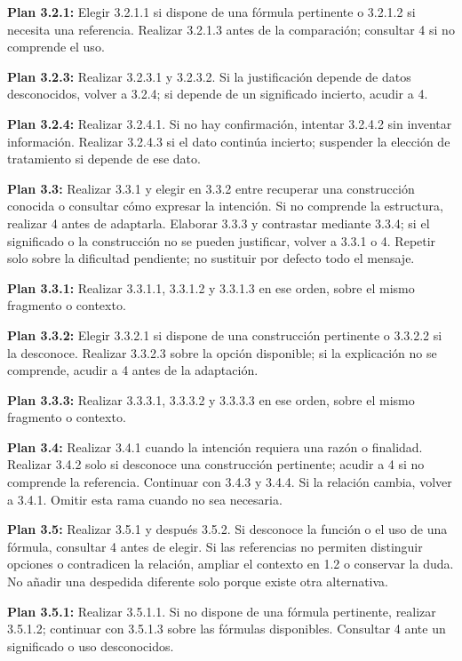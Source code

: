 \documentclass[10pt,a4paper]{article}
\begin{document}
\textbf{Plan 3.2.1:} Elegir 3.2.1.1 si dispone de una fórmula pertinente o 3.2.1.2 si necesita una referencia. Realizar 3.2.1.3 antes de la comparación; consultar 4 si no comprende el uso.\par
\textbf{Plan 3.2.3:} Realizar 3.2.3.1 y 3.2.3.2. Si la justificación depende de datos desconocidos, volver a 3.2.4; si depende de un significado incierto, acudir a 4.\par
\textbf{Plan 3.2.4:} Realizar 3.2.4.1. Si no hay confirmación, intentar 3.2.4.2 sin inventar información. Realizar 3.2.4.3 si el dato continúa incierto; suspender la elección de tratamiento si depende de ese dato.\par
\textbf{Plan 3.3:} Realizar 3.3.1 y elegir en 3.3.2 entre recuperar una construcción conocida o consultar cómo expresar la intención. Si no comprende la estructura, realizar 4 antes de adaptarla. Elaborar 3.3.3 y contrastar mediante 3.3.4; si el significado o la construcción no se pueden justificar, volver a 3.3.1 o 4. Repetir solo sobre la dificultad pendiente; no sustituir por defecto todo el mensaje.\par
\textbf{Plan 3.3.1:} Realizar 3.3.1.1, 3.3.1.2 y 3.3.1.3 en ese orden, sobre el mismo fragmento o contexto.\par
\textbf{Plan 3.3.2:} Elegir 3.3.2.1 si dispone de una construcción pertinente o 3.3.2.2 si la desconoce. Realizar 3.3.2.3 sobre la opción disponible; si la explicación no se comprende, acudir a 4 antes de la adaptación.\par
\textbf{Plan 3.3.3:} Realizar 3.3.3.1, 3.3.3.2 y 3.3.3.3 en ese orden, sobre el mismo fragmento o contexto.\par
\textbf{Plan 3.4:} Realizar 3.4.1 cuando la intención requiera una razón o finalidad. Realizar 3.4.2 solo si desconoce una construcción pertinente; acudir a 4 si no comprende la referencia. Continuar con 3.4.3 y 3.4.4. Si la relación cambia, volver a 3.4.1. Omitir esta rama cuando no sea necesaria.\par
\textbf{Plan 3.5:} Realizar 3.5.1 y después 3.5.2. Si desconoce la función o el uso de una fórmula, consultar 4 antes de elegir. Si las referencias no permiten distinguir opciones o contradicen la relación, ampliar el contexto en 1.2 o conservar la duda. No añadir una despedida diferente solo porque existe otra alternativa.\par
\textbf{Plan 3.5.1:} Realizar 3.5.1.1. Si no dispone de una fórmula pertinente, realizar 3.5.1.2; continuar con 3.5.1.3 sobre las fórmulas disponibles. Consultar 4 ante un significado o uso desconocidos.\par
\end{document}
